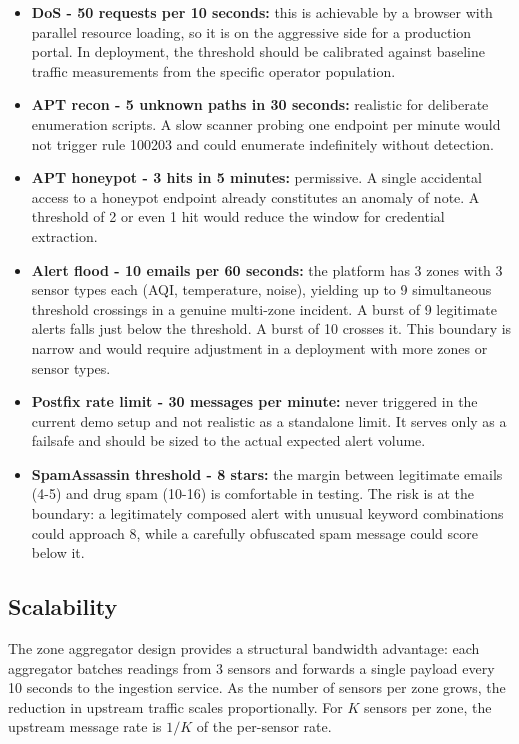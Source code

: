 \begin{itemize}[leftmargin=*]
  \item \textbf{DoS - 50 requests per 10 seconds:} this is achievable by a
        browser with parallel resource loading, so it is on the aggressive side
        for a production portal. In deployment, the threshold should be calibrated
        against baseline traffic measurements from the specific operator population.
  \item \textbf{APT recon - 5 unknown paths in 30 seconds:} realistic for
        deliberate enumeration scripts. A slow scanner probing one endpoint per
        minute would not trigger rule 100203 and could enumerate indefinitely
        without detection.
  \item \textbf{APT honeypot - 3 hits in 5 minutes:} permissive. A single
        accidental access to a honeypot endpoint already constitutes an anomaly
        of note. A threshold of 2 or even 1 hit would reduce the window for
        credential extraction.
  \item \textbf{Alert flood - 10 emails per 60 seconds:} the platform has 3 zones
        with 3 sensor types each (AQI, temperature, noise), yielding up to 9
        simultaneous threshold crossings in a genuine multi-zone incident. A burst
        of 9 legitimate alerts falls just below the threshold. A burst of 10
        crosses it. This boundary is narrow and would require adjustment in a
        deployment with more zones or sensor types.
  \item \textbf{Postfix rate limit - 30 messages per minute:} never triggered
        in the current demo setup and not realistic as a standalone limit. It
        serves only as a failsafe and should be sized to the actual expected alert
        volume.
  \item \textbf{SpamAssassin threshold - 8 stars:} the margin between legitimate
        emails (4-5) and drug spam (10-16) is comfortable in testing. The risk
        is at the boundary: a legitimately composed alert with unusual keyword
        combinations could approach 8, while a carefully obfuscated spam message
        could score below it.
\end{itemize}

\subsection{Scalability}

The zone aggregator design provides a structural bandwidth advantage: each
aggregator batches readings from 3 sensors and forwards a single payload every
10 seconds to the ingestion service. As the number of sensors per zone grows,
the reduction in upstream traffic scales proportionally. For $K$ sensors per zone,
the upstream message rate is $1/K$ of the per-sensor rate.

